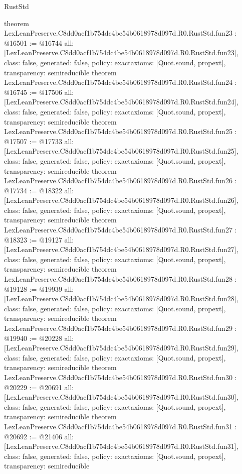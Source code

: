 \begin{lexlean}{RustStd}
\begin{coremodule}
{}
theorem LexLeanPreserve.C8dd0acf1b754dc4be54b0618978d097d.R0.RustStd.fun23 : @16501 := @16744 {
  all: [LexLeanPreserve.C8dd0acf1b754dc4be54b0618978d097d.R0.RustStd.fun23],
  class: false,
  generated: false,
  policy: exact{axioms: [Quot.sound, propext]},
  transparency: semireducible
}
theorem LexLeanPreserve.C8dd0acf1b754dc4be54b0618978d097d.R0.RustStd.fun24 : @16745 := @17506 {
  all: [LexLeanPreserve.C8dd0acf1b754dc4be54b0618978d097d.R0.RustStd.fun24],
  class: false,
  generated: false,
  policy: exact{axioms: [Quot.sound, propext]},
  transparency: semireducible
}
theorem LexLeanPreserve.C8dd0acf1b754dc4be54b0618978d097d.R0.RustStd.fun25 : @17507 := @17733 {
  all: [LexLeanPreserve.C8dd0acf1b754dc4be54b0618978d097d.R0.RustStd.fun25],
  class: false,
  generated: false,
  policy: exact{axioms: [Quot.sound, propext]},
  transparency: semireducible
}
theorem LexLeanPreserve.C8dd0acf1b754dc4be54b0618978d097d.R0.RustStd.fun26 : @17734 := @18322 {
  all: [LexLeanPreserve.C8dd0acf1b754dc4be54b0618978d097d.R0.RustStd.fun26],
  class: false,
  generated: false,
  policy: exact{axioms: [Quot.sound, propext]},
  transparency: semireducible
}
theorem LexLeanPreserve.C8dd0acf1b754dc4be54b0618978d097d.R0.RustStd.fun27 : @18323 := @19127 {
  all: [LexLeanPreserve.C8dd0acf1b754dc4be54b0618978d097d.R0.RustStd.fun27],
  class: false,
  generated: false,
  policy: exact{axioms: [Quot.sound, propext]},
  transparency: semireducible
}
theorem LexLeanPreserve.C8dd0acf1b754dc4be54b0618978d097d.R0.RustStd.fun28 : @19128 := @19939 {
  all: [LexLeanPreserve.C8dd0acf1b754dc4be54b0618978d097d.R0.RustStd.fun28],
  class: false,
  generated: false,
  policy: exact{axioms: [Quot.sound, propext]},
  transparency: semireducible
}
theorem LexLeanPreserve.C8dd0acf1b754dc4be54b0618978d097d.R0.RustStd.fun29 : @19940 := @20228 {
  all: [LexLeanPreserve.C8dd0acf1b754dc4be54b0618978d097d.R0.RustStd.fun29],
  class: false,
  generated: false,
  policy: exact{axioms: [Quot.sound, propext]},
  transparency: semireducible
}
theorem LexLeanPreserve.C8dd0acf1b754dc4be54b0618978d097d.R0.RustStd.fun30 : @20229 := @20691 {
  all: [LexLeanPreserve.C8dd0acf1b754dc4be54b0618978d097d.R0.RustStd.fun30],
  class: false,
  generated: false,
  policy: exact{axioms: [Quot.sound, propext]},
  transparency: semireducible
}
theorem LexLeanPreserve.C8dd0acf1b754dc4be54b0618978d097d.R0.RustStd.fun31 : @20692 := @21406 {
  all: [LexLeanPreserve.C8dd0acf1b754dc4be54b0618978d097d.R0.RustStd.fun31],
  class: false,
  generated: false,
  policy: exact{axioms: [Quot.sound, propext]},
  transparency: semireducible
}
\end{coremodule}
\end{lexlean}
